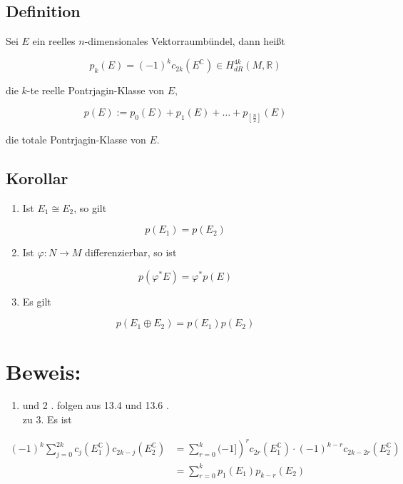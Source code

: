 \documentclass[10pt, letterpaper]{article}
\begin{document}
\subsection*{Definition}
Sei $E$ ein reelles $n$-dimensionales Vektorraumbündel, dann heißt

$$
p_{k}(E)=(-1)^{k} c_{2 k}\left(E^{\mathbb{C}}\right) \in H_{d R}^{4 k}(M, \mathbb{R})
$$

die $k$-te reelle Pontrjagin-Klasse von $E$,

$$
p(E):=p_{0}(E)+p_{1}(E)+\ldots+p_{\left[\frac{n}{2}\right]}(E)
$$

die totale Pontrjagin-Klasse von $E$.

\subsection*{Korollar}
\begin{enumerate}
  \item Ist $E_{1} \cong E_{2}$, so gilt
\end{enumerate}

$$
p\left(E_{1}\right)=p\left(E_{2}\right)
$$

\begin{enumerate}
  \setcounter{enumi}{1}
  \item Ist $\varphi: N \rightarrow M$ differenzierbar, so ist
\end{enumerate}

$$
p\left(\varphi^{*} E\right)=\varphi^{*} p(E)
$$

\begin{enumerate}
  \setcounter{enumi}{2}
  \item Es gilt
\end{enumerate}

$$
p\left(E_{1} \oplus E_{2}\right)=p\left(E_{1}\right) p\left(E_{2}\right)
$$

\section*{Beweis:}
\begin{enumerate}
  \item und 2 . folgen aus 13.4 und 13.6 .\\
zu 3. Es ist
\end{enumerate}

$$
\begin{aligned}
(-1)^{k} \sum_{j=0}^{2 k} c_{j}\left(E_{1}^{\mathbb{C}}\right) c_{2 k-j}\left(E_{2}^{\mathbb{C}}\right) & \left.=\sum_{r=0}^{k}(-1]\right)^{r} c_{2 r}\left(E_{1}^{\mathbb{C}}\right) \cdot(-1)^{k-r} c_{2 k-2 r}\left(E_{2}^{\mathbb{C}}\right) \\
& =\sum_{r=0}^{k} p_{1}\left(E_{1}\right) p_{k-r}\left(E_{2}\right)
\end{aligned}
$$
\end{document}
